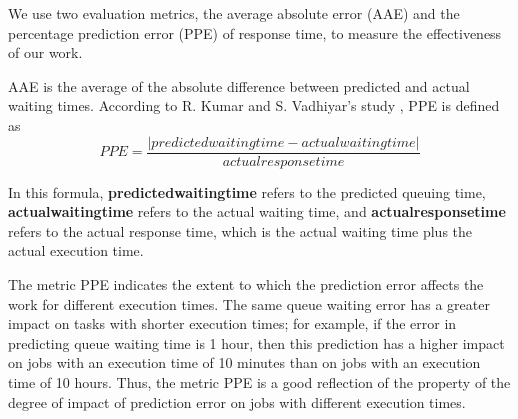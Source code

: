 \documentclass[conference,compsoc]{IEEEtran}
\begin{document}
We use two evaluation metrics, the average absolute error (AAE) and the percentage prediction error (PPE) of response time, to measure the effectiveness of our work. 

AAE is the average of the absolute difference between predicted and actual waiting times. According to R. Kumar and S. Vadhiyar's study \cite{kumarandvadhiyar}, PPE is defined as
$$
PPE=\frac{\left | predicted waiting time- actual waiting time \right |}{actual response time} 
$$

In this formula, \textbf{predictedwaitingtime} refers to the predicted queuing time, \textbf{actualwaitingtime} refers to the actual waiting time, and \textbf{actualresponsetime} refers to the actual response time, which is the actual waiting time plus the actual execution time.

The metric PPE indicates the extent to which the prediction error affects the work for different execution times. The same queue waiting error has a greater impact on tasks with shorter execution times; for example, if the error in predicting queue waiting time is 1 hour, then this prediction has a higher impact on jobs with an execution time of 10 minutes than on jobs with an execution time of 10 hours. Thus, the metric PPE is a good reflection of the property of the degree of impact of prediction error on jobs with different execution times.
\end{document}
